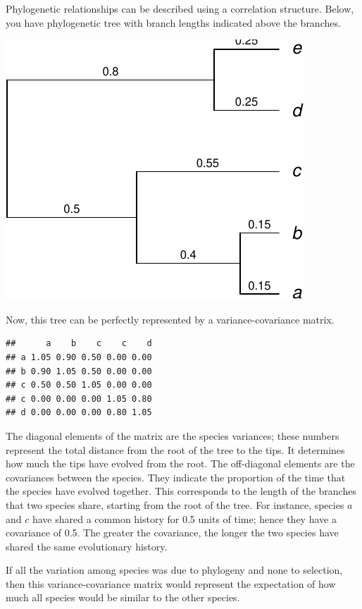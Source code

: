\documentclass[
]{book}
\begin{document}
Phylogenetic relationships can be described using a correlation structure. Below, you have phylogenetic tree with branch lengths indicated above the branches.

\begin{flushleft}\includegraphics{pcm-workshop_files/figure-latex/phylogenetic tree example-1} \end{flushleft}

Now, this tree can be perfectly represented by a variance-covariance matrix.

\begin{verbatim}
##      a    b    c    c    d
## a 1.05 0.90 0.50 0.00 0.00
## b 0.90 1.05 0.50 0.00 0.00
## c 0.50 0.50 1.05 0.00 0.00
## c 0.00 0.00 0.00 1.05 0.80
## d 0.00 0.00 0.00 0.80 1.05
\end{verbatim}

The diagonal elements of the matrix are the species variances; these numbers represent the total distance from the root of the tree to the tips. It determines how much the tips have evolved from the root. The off-diagonal elements are the covariances between the species. They indicate the proportion of the time that the species have evolved together. This corresponds to the length of the branches that two species share, starting from the root of the tree. For instance, species \(a\) and \(c\) have shared a common history for 0.5 units of time; hence they have a covariance of 0.5. The greater the covariance, the longer the two species have shared the same evolutionary history.

If all the variation among species was due to phylogeny and none to selection, then this variance-covariance matrix would represent the expectation of how much all species would be similar to the other species.
\end{document}
